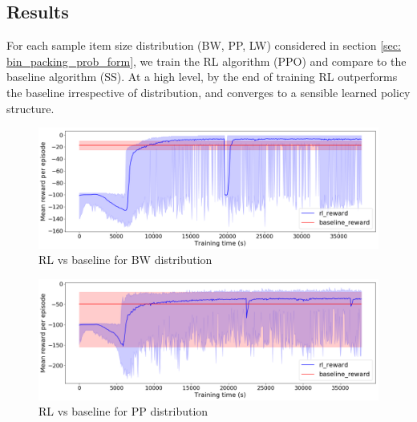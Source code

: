 \documentclass{article}
\begin{document}
\subsection{Results}
For each sample item size distribution (BW, PP, LW) considered in section \ref{sec: bin_packing_prob_form}, we train the RL algorithm (PPO) and compare to the baseline algorithm (SS).  At a high level, by the end of training RL outperforms the baseline irrespective of distribution, and converges to a sensible learned policy structure.
\begin{figure}[h!]
	\centering
	\includegraphics[width=1\linewidth]{images/bin_packing_rl_vs_baseline_bounded_waste_binsize_9.png}
	\caption{RL vs baseline for BW distribution}
	\label{fig:bin_packing_BW_dist}
\end{figure}

\begin{figure}[h!]
	\centering
	\includegraphics[width=1\linewidth]{images/bin_packing_rl_vs_baseline_perfect_pack_binsize_9.png}
	\caption{RL vs baseline for PP distribution}
	\label{fig:bin_packing_PP_dist}
\end{figure}
\end{document}
